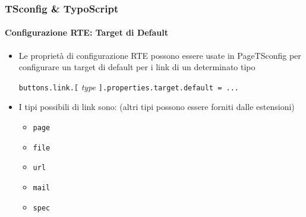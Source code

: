 \begin{frame}[fragile]
	\frametitle{TSconfig \& TypoScript}
	\framesubtitle{Configurazione RTE: Target di Default}

	\begin{itemize}

		\item Le proprietà di configurazione RTE possono essere usate in PageTSconfig per configurare un target
			di default per i link di un determinato tipo\newline

			\small
				\texttt{buttons.link.[}
				\textit{type}
				\texttt{].properties.target.default = ...}
			\normalsize\newline

		\item I tipi possibili di link sono:\newline
			\small
				(altri tipi possono essere forniti dalle estensioni)
			\normalsize

			\begin{itemize}
				\item \texttt{page}
				\item \texttt{file}
				\item \texttt{url}
				\item \texttt{mail}
				\item \texttt{spec}
			\end{itemize}
	\end{itemize}

\end{frame}

